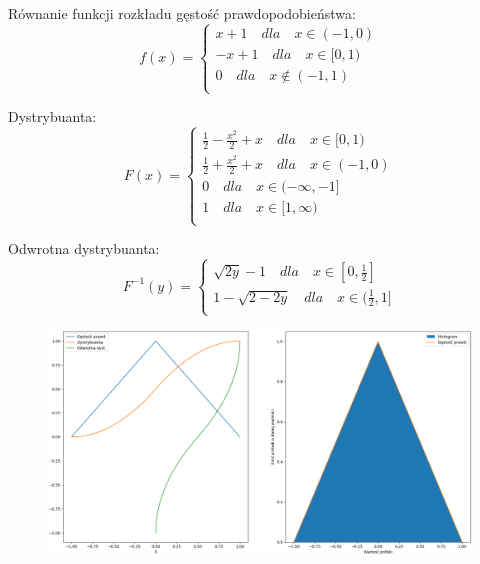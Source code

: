 \documentclass[12pt,a4paper]{article}
\begin{document}
  Równanie funkcji rozkładu gęstość prawdopodobieństwa:
  \begin{equation}
    f(x) = \begin{cases}
        x + 1 \quad dla \quad x  \in (-1, 0)\\
        -x + 1 \quad dla \quad x  \in [0, 1)\\
        0 \quad dla \quad x  \notin (-1, 1)\\
      \end{cases}   
  \end{equation}

  Dystrybuanta:
  \begin{equation}
    F(x) = \begin{cases}
        \frac{1}{2} - \frac{x^2}{2} + x \quad dla \quad x  \in [0, 1)\\
        \frac{1}{2} + \frac{x^2}{2} + x \quad dla \quad x  \in (-1, 0)\\
        0 \quad dla \quad x  \in (-\infty, -1]\\
        1 \quad dla \quad x  \in [1, \infty)\\
      \end{cases}   
  \end{equation}

  Odwrotna dystrybuanta:
  \begin{equation}
    F^{-1}(y) = \begin{cases}
          \sqrt{2y} -1 \quad dla \quad x  \in [0, \frac{1}{2}]\\
          1 -\sqrt{2 - 2y} \quad dla \quad x  \in (\frac{1}{2}, 1]\\
        \end{cases}   
  \end{equation}

  \begin{figure}[H]
    \centering
    \includegraphics[width=1\textwidth]{figures/Figure_17.png}
    \label{fig:17}
  \end{figure}
\end{document}
